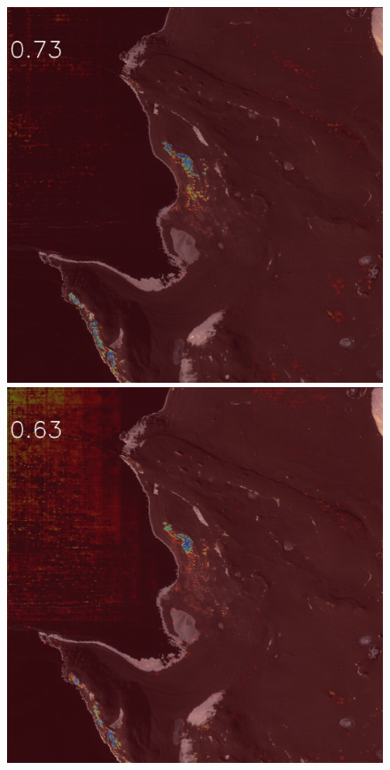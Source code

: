 \begin{figure}[h]
\includegraphics[width=\subFigx]{./fig/datagrow/MSE_single_unet_train_1_1.txt_bias-1_bs128_do0.1e25/2.png}
\includegraphics[width=\subFigx]{./fig/datagrow/MSE_single_unet_train_1_2.txt_bias-1_bs128_do0.1e25/2.png}

\end{figure}
